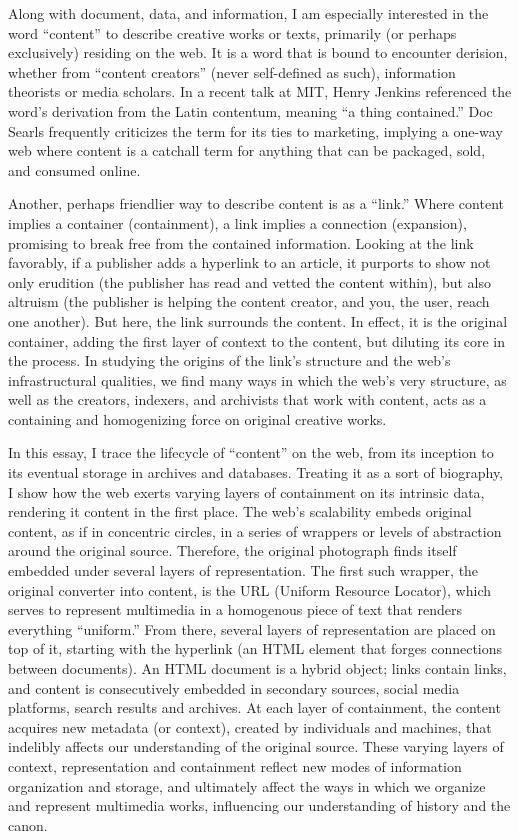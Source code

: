 Along with document, data, and information, I am especially interested in the word “content” to describe creative works or texts, primarily (or perhaps exclusively) residing on the web. It is a word that is bound to encounter derision, whether from “content creators” (never self-defined as such), information theorists or media scholars. In a recent talk at MIT, Henry Jenkins referenced the word’s derivation from the Latin contentum, meaning “a thing contained.”  Doc Searls frequently criticizes the term for its ties to marketing, implying a one-way web where content is a catchall term for anything that can be packaged, sold, and consumed online. 

Another, perhaps friendlier way to describe content is as a “link.” Where content implies a container (containment), a link implies a connection (expansion), promising to break free from the contained information. Looking at the link favorably, if a publisher adds a hyperlink to an article, it purports to show not only erudition (the publisher has read and vetted the content within), but also altruism (the publisher is helping the content creator, and you, the user, reach one another). But here, the link surrounds the content. In effect, it is the original container, adding the first layer of context to the content, but diluting its core in the process. In studying the origins of the link’s structure and the web’s infrastructural qualities, we find many ways in which the web’s very structure, as well as the creators, indexers, and archivists that work with content, acts as a containing and homogenizing force on original creative works.

In this essay, I trace the lifecycle of “content” on the web, from its inception to its eventual storage in archives and databases. Treating it as a sort of biography, I show how the web exerts varying layers of containment on its intrinsic data, rendering it content in the first place. The web’s scalability embeds original content, as if in concentric circles, in a series of wrappers or levels of abstraction around the original source. Therefore, the original photograph finds itself embedded under several layers of representation. The first such wrapper, the original converter into content, is the URL (Uniform Resource Locator), which serves to represent multimedia in a homogenous piece of text that renders everything “uniform.” From there, several layers of representation are placed on top of it, starting with the hyperlink (an HTML element that forges connections between documents). An HTML document is a hybrid object; links contain links, and content is consecutively embedded in secondary sources, social media platforms, search results and archives. At each layer of containment, the content acquires new metadata (or context), created by individuals and machines, that indelibly affects our understanding of the original source. These varying layers of context, representation and containment reflect new modes of information organization and storage, and ultimately affect the ways in which we organize and represent multimedia works, influencing our understanding of history and the canon.

